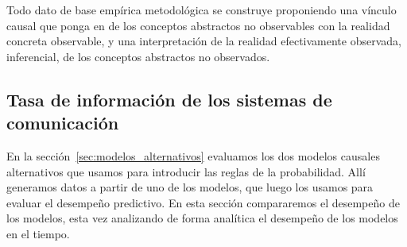 \documentclass[a4paper,11pt]{book}
\theoremstyle{definition}
\begin{document}

Todo dato de base empírica metodológica se construye proponiendo una vínculo causal que ponga en de los conceptos abstractos no observables con la realidad concreta observable, y una interpretación de la realidad efectivamente observada, inferencial, de los conceptos abstractos no observados.

\subsection{Tasa de información de los sistemas de comunicación}

En la sección~\ref{sec:modelos_alternativos} evaluamos los dos modelos causales alternativos que usamos para introducir las reglas de la probabilidad.
%
Allí generamos datos a partir de uno de los modelos, que luego los usamos para evaluar el desempeño predictivo.
%
En esta sección compararemos el desempeño de los modelos, esta vez analizando de forma analítica el desempeño de los modelos en el tiempo.

\end{document}

